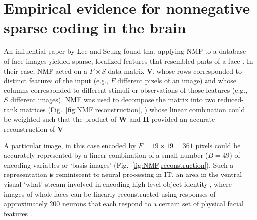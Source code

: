 \section*{Empirical evidence for nonnegative sparse coding in the brain}

An influential paper by Lee and Seung \cite{LeeSeung1999}
found that applying \ac{NMF} to a database of face images
yielded sparse, localized features that resembled parts of a face
.
In their case, \ac{NMF} acted on a
$F \times S$ data matrix \textbf{V},
whose rows corresponded to distinct features of the input 
(e.g., $F$ different pixels of an image)
and whose columns corresponded to different stimuli or 
observations of those features
(e.g., $S$ different images).
\ac{NMF} was used to decompose the matrix into two reduced-rank matrices
(Fig.~\ref{fig:NMF|reconstruction}, )
whose linear combination could be weighted such that the product of \textbf{W} and \textbf{H} provided an accurate reconstruction of \textbf{V}

A particular image, in this case encoded by $F = 19 \times 19 = 361$ pixels
could be accurately represented by a linear combination of 
a small number ($B = 49$) of encoding variables or `basis images'
(Fig.~\ref{fig:NMF|reconstruction}).
Such a representation is reminiscent to neural processing in \ac{IT},
an area in the ventral visual `what' stream
involved in encoding high-level object identity
\cite{BrincatConnor2004,Majaj2015},
where images of whole faces can be linearly reconstructed
using responses of approximately $200$ neurons
that each respond to a certain set of physical facial features
\cite{ChangTsao2017}.

